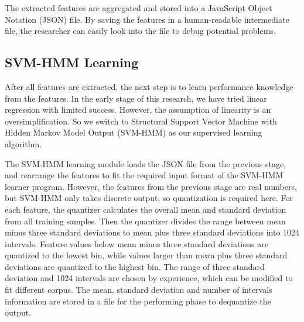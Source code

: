    The extracted features are aggregated and stored into a JavaScript Object Notation (JSON) file. By saving the features in a human-readable intermediate file, the researcher can easily look into the file to debug potential problems.%


\subsection{SVM-HMM Learning}
After all features are extracted, the next step is to learn performance knowledge from the features. In the early stage of this research, we have tried linear regression with limited success\cite{Lyu2012}. However, the assumption of linearity is an oversimplification. So we switch to Structural Support Vector Machine with Hidden Markov Model Output (SVM-HMM)\cite{svm2009, svm2005, svm2003}  as our supervised learning algorithm. 

The SVM-HMM learning module loads the JSON file from the previous stage, and rearrange the features to fit the required input format of the SVM-HMM learner program. However, the features from the previous stage are real numbers, but SVM-HMM only takes discrete output, so quantization is required here. For each feature, the quantizer calculates the overall mean and standard deviation from all training samples. Then the quantizer divides the range between mean minus three standard deviations to mean plus three standard deviations into 1024 intervals. Feature values below mean minus three standard deviations are quantized to the lowest bin, while values larger than mean plus three standard deviations are quantized to the highest bin. The range of three standard deviation and 1024 intervals are chosen by experience, which can be modified to fit different corpus. The mean, standard deviation and number of intervals information are stored in a file for the performing phase to dequantize the output.

